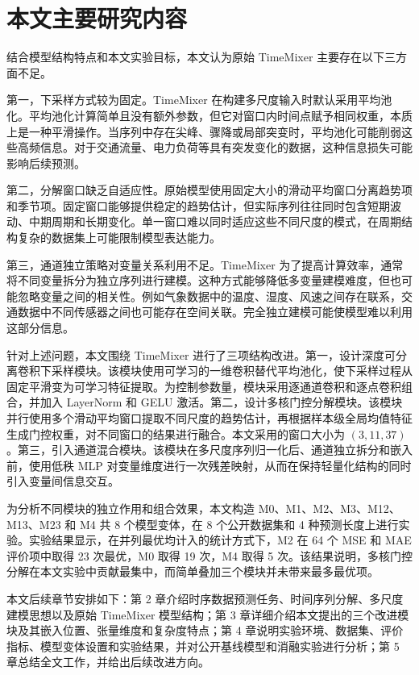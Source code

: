 \section{本文主要研究内容}

结合模型结构特点和本文实验目标，本文认为原始 TimeMixer 主要存在以下三方面不足。

第一，下采样方式较为固定。TimeMixer 在构建多尺度输入时默认采用平均池化。平均池化计算简单且没有额外参数，但它对窗口内时间点赋予相同权重，本质上是一种平滑操作。当序列中存在尖峰、骤降或局部突变时，平均池化可能削弱这些高频信息。对于交通流量、电力负荷等具有突发变化的数据，这种信息损失可能影响后续预测。

第二，分解窗口缺乏自适应性。原始模型使用固定大小的滑动平均窗口分离趋势项和季节项。固定窗口能够提供稳定的趋势估计，但实际序列往往同时包含短期波动、中期周期和长期变化。单一窗口难以同时适应这些不同尺度的模式，在周期结构复杂的数据集上可能限制模型表达能力。

第三，通道独立策略对变量关系利用不足。TimeMixer 为了提高计算效率，通常将不同变量拆分为独立序列进行建模。这种方式能够降低多变量建模难度，但也可能忽略变量之间的相关性。例如气象数据中的温度、湿度、风速之间存在联系，交通数据中不同传感器之间也可能存在空间关联。完全独立建模可能使模型难以利用这部分信息。

针对上述问题，本文围绕 TimeMixer 进行了三项结构改进。第一，设计深度可分离卷积下采样模块。该模块使用可学习的一维卷积替代平均池化，使下采样过程从固定平滑变为可学习特征提取。为控制参数量，模块采用逐通道卷积和逐点卷积组合，并加入 LayerNorm 和 GELU 激活。第二，设计多核门控分解模块。该模块并行使用多个滑动平均窗口提取不同尺度的趋势估计，再根据样本级全局均值特征生成门控权重，对不同窗口的结果进行融合。本文采用的窗口大小为 $(3, 11, 37)$。第三，引入通道混合模块。该模块在多尺度序列归一化后、通道独立拆分和嵌入前，使用低秩 MLP 对变量维度进行一次残差映射，从而在保持轻量化结构的同时引入变量间信息交互。

为分析不同模块的独立作用和组合效果，本文构造 M0、M1、M2、M3、M12、M13、M23 和 M4 共 8 个模型变体，在 8 个公开数据集和 4 种预测长度上进行实验。实验结果显示，在并列最优均计入的统计方式下，M2 在 64 个 MSE 和 MAE 评价项中取得 23 次最优，M0 取得 19 次，M4 取得 5 次。该结果说明，多核门控分解在本文实验中贡献最集中，而简单叠加三个模块并未带来最多最优项。

本文后续章节安排如下：第 2 章介绍时序数据预测任务、时间序列分解、多尺度建模思想以及原始 TimeMixer 模型结构；第 3 章详细介绍本文提出的三个改进模块及其嵌入位置、张量维度和复杂度特点；第 4 章说明实验环境、数据集、评价指标、模型变体设置和实验结果，并对公开基线模型和消融实验进行分析；第 5 章总结全文工作，并给出后续改进方向。
